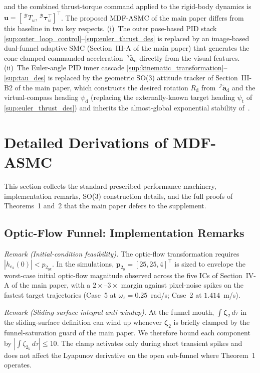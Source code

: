 \documentclass[10pt,journal]{IEEEtran}
\begin{document}
and the combined thrust-torque command applied to the rigid-body dynamics is $\boldsymbol{u}=[\,^\mathcal{B}T_u,\,^\mathcal{B}\boldsymbol{\tau}_u^\top]^\top$. The proposed MDF-ASMC of the main paper differs from this baseline in two key respects. (i)~The outer pose-based PID stack \eqref{sup:outer_loop_control}--\eqref{sup:euler_thrust_des} is replaced by an image-based dual-funnel adaptive SMC (Section~III-A of the main paper) that generates the cone-clamped commanded acceleration $\,^\mathcal{I}\tilde{\boldsymbol{a}}_\text{d}$ directly from the visual features. (ii)~The Euler-angle PID inner cascade \eqref{sup:kinematic_transformation}--\eqref{sup:tau_des} is replaced by the geometric SO(3) attitude tracker of Section~III-B2 of the main paper, which constructs the desired rotation $R_\text{d}$ from $\,^\mathcal{I}\tilde{\boldsymbol{a}}_\text{d}$ and the virtual-compass heading $\psi_\text{d}$ (replacing the externally-known target heading $\psi_\text{t}$ of \eqref{sup:euler_thrust_des}) and inherits the almost-global exponential stability of~\cite{lee2010}.

\clearpage
\section{Detailed Derivations of MDF-ASMC}
\label{sup:detailed}
This section collects the standard prescribed-performance machinery, implementation remarks, SO(3) construction details, and the full proofs of Theorems~1 and~2 that the main paper defers to the supplement.

\subsection{Optic-Flow Funnel: Implementation Remarks}
\label{sup:optic_flow_remarks}
\textit{Remark (Initial-condition feasibility).} The optic-flow transformation requires $|h_{e_k}(0)|<p_{2_{0k}}$. In the simulations, $\boldsymbol{p}_{2_0}=[25,25,4]^\top$ is sized to envelope the worst-case initial optic-flow magnitude observed across the five ICs of Section~IV-A of the main paper, with a $2\times$--$3\times$ margin against pixel-noise spikes on the fastest target trajectories (Case~5 at $\omega_z=0.25$~rad/s; Case~2 at $1.414$~m/s).

\textit{Remark (Sliding-surface integral anti-windup).} At the funnel mouth, $\int\boldsymbol{\zeta}_2\,d\tau$ in the sliding-surface definition can wind up whenever $\boldsymbol{\zeta}_2$ is briefly clamped by the funnel-saturation guard of the main paper. We therefore bound each component by $|\!\int\!\zeta_{2_k}\,d\tau|\le 10$. The clamp activates only during short transient spikes and does not affect the Lyapunov derivative on the open sub-funnel where Theorem~1 operates.
\end{document}
